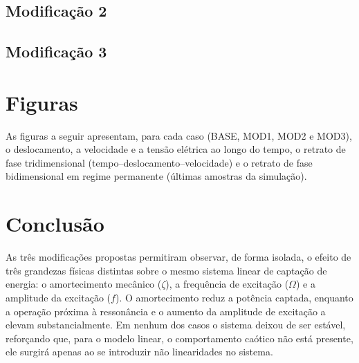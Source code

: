 \documentclass[a4paper,11pt]{article}
\begin{document}
\subsection{Modificação 2}


\subsection{Modificação 3}



\section{Figuras}
\label{sec:figuras}

As figuras a seguir apresentam, para cada caso (BASE, MOD1, MOD2 e MOD3),
o deslocamento, a velocidade e a tensão elétrica ao longo do tempo, o
retrato de fase tridimensional (tempo--deslocamento--velocidade) e o
retrato de fase bidimensional em regime permanente (últimas amostras da
simulação).



\section{Conclusão}

As três modificações propostas permitiram observar, de forma isolada, o
efeito de três grandezas físicas distintas sobre o mesmo sistema linear
de captação de energia: o amortecimento mecânico ($\zeta$), a frequência
de excitação ($\Omega$) e a amplitude da excitação ($f$). O amortecimento
reduz a potência captada, enquanto a operação próxima à ressonância e o
aumento da amplitude de excitação a elevam substancialmente. Em nenhum
dos casos o sistema deixou de ser estável, reforçando que, para o modelo
linear, o comportamento caótico não está presente, ele surgirá apenas
ao se introduzir não linearidades no sistema.
\end{document}
